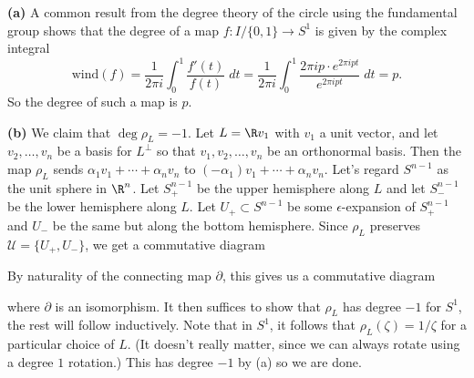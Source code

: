 \documentclass[11pt,letterpaper]{article}
\begin{document}
\begin{solution}
    \textbf{(a)} A common result from the degree theory of the circle using the fundamental group shows that the degree of a map $f : I /\{0,1\} \to S^1$ is given by the complex integral
    \[
        \text{wind}(f) = \frac{1}{2\pi i}\int_0^1 \frac{f'(t)}{f(t)}\;dt=\frac{1}{2\pi i}\int_0^1 \frac{2\pi i p \cdot e^{2\pi i p t}}{e^{2\pi i p t}}\;dt = p
    .\] 
    So the degree of such a map is $p$.

    \textbf{(b)} We claim that $\deg \rho_L = -1$. Let $L=\R v_1$ with $v_1$ a unit vector, and let $v_2,\ldots,v_n$ be a basis for $L^\perp$ so that $v_1,v_2,\ldots,v_n$ be an orthonormal basis. Then the map $\rho_L$ sends $\alpha_1v_1+\cdots+\alpha_n v_n$ to $(-\alpha_1)v_1+\cdots+\alpha_n v_n$. Let's regard $S^{n-1}$ as the unit sphere in $\R^n$. Let $S^{n-1}_+$ be the upper hemisphere along $L$ and let $S^{n-1}_-$ be the lower hemisphere along $L$. Let $U_+\subset S^{n-1}$ be some $\epsilon$-expansion of $S^{n-1}_+$ and $U_-$ be the same but along the bottom hemisphere. Since $\rho_L$ preserves $\mathcal{U}=\{U_+, U_-\}$, we get a commutative diagram 
    \begin{center}
    \end{center}
    By naturality of the connecting map $\partial$, this gives us a commutative diagram
    \begin{center}
    \end{center}
    where $\partial$ is an isomorphism. It then suffices to show that $\rho_L$ has degree $-1$ for $S^1$, the rest will follow inductively. Note that in $S^1$, it follows that $\rho_L(\zeta)=1 /\zeta$ for a particular choice of $L$. (It doesn't really matter, since we can always rotate using a degree $1$ rotation.) This has degree $-1$ by (a) so we are done.


\end{solution}
\end{document}
